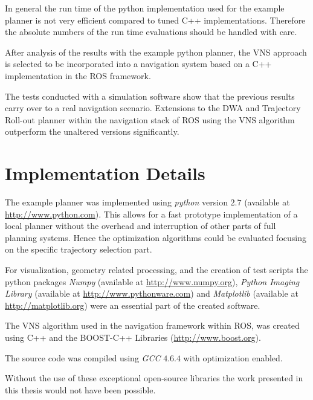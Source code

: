 In general the run time of the python implementation used for the example planner is not very efficient compared to tuned C++ implementations. 
Therefore the absolute numbers of the run time evaluations should be handled with care.

After analysis of the results with the example python planner, the VNS approach is selected to be incorporated into a navigation system based on a C++ implementation in the ROS framework.

The tests conducted with a simulation software show that the previous results carry over to a real navigation scenario. Extensions to the DWA and Trajectory Roll-out planner within the navigation stack of ROS using the VNS algorithm outperform the unaltered versions significantly.

\section{Implementation Details}
The example planner was implemented using \emph{python} version $2.7$ (available at \url{http://www.python.com}). This allows for a fast prototype implementation of a local planner without the overhead and interruption of other parts of full planning systems.
Hence the optimization algorithms could be evaluated focusing on the  specific trajectory selection part. 

For visualization, geometry related processing, and the creation of test scripts the python packages \emph{Numpy} (available at \url{http://www.numpy.org}), \emph{Python Imaging Library} (available at \url{http://www.pythonware.com}) and \emph{Matplotlib} (available at \url{http://matplotlib.org}) were an essential part of the created software. 

The VNS algorithm used in the navigation framework within ROS, was created using C++ and the BOOST-C++ Libraries (\url{http://www.boost.org}).

The source code was compiled using \emph{GCC} $4.6.4$ with optimization enabled.

Without the use of these exceptional open-source libraries the work presented in this thesis would not have been possible.  

 

